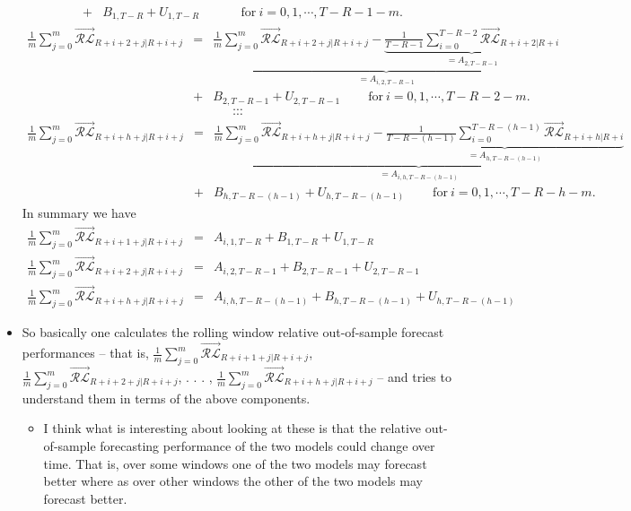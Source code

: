 \documentclass[11pt]{article}
\begin{document}
\begin{itemize}
\begin{eqnarray}
\!\!\!\!&+&\!\!\!\!B_{1,T-R}+U_{1,T-R} \ \ \ \ \   \ \ \ \ \   \ \ \ \ \   \mathrm{for} \ i=0,1,\cdots,T\!-\!R\!-\!1\!-\!m. \nonumber
\end{eqnarray}
\begin{eqnarray}
\frac{1}{m}\sum_{j=0}^{m}\overrightarrow{\mathcal{RL}}_{R+i+2+j|R+i+j}\!\!\!\!&=&\!\!\!\!\underbrace{\frac{1}{m}\sum_{j=0}^{m}\overrightarrow{\mathcal{RL}}_{R+i+2+j|R+i+j}-\underbrace{\frac{1}{T\!-\!R\!-\!1}\!\!\sum_{i=0}^{T-R-2}\!\!\overrightarrow{\mathcal{RL}}_{R+i+2|R+i}}_{=A_{2,T\!-\!R\!-\!1}}}_{=A_{i,2,T-R-1}} \nonumber \\
\!\!\!\!&+&\!\!\!\!B_{2,T-R-1}+U_{2,T-R-1} \ \ \ \ \   \ \ \ \ \   \mathrm{for} \ i=0,1,\cdots,T\!-\!R\!-\!2\!-\!m. \nonumber
\end{eqnarray}
\[ \cdots \]
\[ \cdots \]
\begin{eqnarray}
\frac{1}{m}\sum_{j=0}^{m}\overrightarrow{\mathcal{RL}}_{R+i+h+j|R+i+j}\!\!\!\!&=&\!\!\!\!\underbrace{\frac{1}{m}\sum_{j=0}^{m}\overrightarrow{\mathcal{RL}}_{R+i+h+j|R+i+j}-\underbrace{\frac{1}{T\!-\!R\!-\!(h\!-\!1)}\!\!\sum_{i=0}^{T-R-(h-1)}\!\!\overrightarrow{\mathcal{RL}}_{R+i+h|R+i}}_{=A_{h,T\!-\!R-(h-1)}}}_{=A_{i,h,T-R-(h-1)}} \nonumber \\
\!\!\!\!&+&\!\!\!\!B_{h,T-R-(h-1)}+U_{h,T-R-(h-1)} \ \ \ \ \   \ \ \ \ \   \mathrm{for} \ i=0,1,\cdots,T\!-\!R\!-\!h\!-\!m. \nonumber
\end{eqnarray}
In summary we have
\begin{eqnarray}
\frac{1}{m}\sum_{j=0}^{m}\overrightarrow{\mathcal{RL}}_{R+i+1+j|R+i+j}\!\!\!\!&=&\!\!\!\!A_{i,1,T-R}+B_{1,T-R}+U_{1,T-R} \nonumber \\
\frac{1}{m}\sum_{j=0}^{m}\overrightarrow{\mathcal{RL}}_{R+i+2+j|R+i+j}\!\!\!\!&=&\!\!\!\!A_{i,2,T-R-1}+B_{2,T-R-1}+U_{2,T-R-1} \nonumber \\
\frac{1}{m}\sum_{j=0}^{m}\overrightarrow{\mathcal{RL}}_{R+i+h+j|R+i+j}\!\!\!\!&=&\!\!\!\!A_{i,h,T-R-(h-1)}+B_{h,T-R-(h-1)}+U_{h,T-R-(h-1)} \nonumber
\end{eqnarray}
\item So basically one calculates the rolling window relative out-of-sample forecast performances -- that is, $\frac{1}{m}\sum_{j=0}^{m}\overrightarrow{\mathcal{RL}}_{R+i+1+j|R+i+j}$, $\frac{1}{m}\sum_{j=0}^{m}\overrightarrow{\mathcal{RL}}_{R+i+2+j|R+i+j}$, . . . , $\frac{1}{m}\sum_{j=0}^{m}\overrightarrow{\mathcal{RL}}_{R+i+h+j|R+i+j}$ -- and tries to understand them in terms of the above components. 
\begin{itemize}
\item  I think what is interesting about looking at these is that the relative out-of-sample forecasting performance of the two models could change over time.  That is, over some windows one of the two models may forecast better where as over other windows the other of the two models may forecast better. 

\end{itemize}
\end{itemize}
\end{document}
